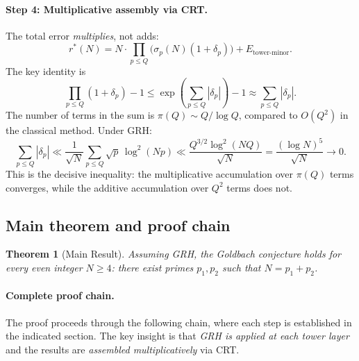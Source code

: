 \documentclass[11pt,a4paper]{article}
\newtheorem{theorem}{Theorem}[section]
\theoremstyle{remark}
\begin{document}
\paragraph{Step 4: Multiplicative assembly via CRT.}
The total error \emph{multiplies}, not adds:
\begin{equation}
\label{eq:multiplicative-error}
  r^*(N) = N \cdot \prod_{p \leq Q}\bigl(\sigma_p(N)(1 + \delta_p)\bigr)
    + E_{\text{tower-minor}}.
\end{equation}
The key identity is
\begin{equation}
\label{eq:product-to-sum}
  \prod_{p \leq Q}(1+\delta_p) - 1
  \leq \exp\!\left(\sum_{p \leq Q}|\delta_p|\right) - 1
  \approx \sum_{p \leq Q}|\delta_p|.
\end{equation}
The number of terms in the sum is $\pi(Q) \sim Q/\log Q$, compared to
$O(Q^2)$ in the classical method.  Under GRH:
\begin{equation}
\label{eq:GRH-sum}
  \sum_{p \leq Q}|\delta_p|
  \ll \frac{1}{\sqrt{N}}\sum_{p \leq Q}\sqrt{p}\,\log^2(Np)
  \ll \frac{Q^{3/2}\log^2(NQ)}{\sqrt{N}}
  = \frac{(\log N)^5}{\sqrt{N}} \to 0.
\end{equation}
This is the decisive inequality: the multiplicative accumulation
over $\pi(Q)$ terms converges, while the additive accumulation
over $Q^2$ terms does not.

\subsection{Main theorem and proof chain}

\begin{theorem}[Main Result]
\label{thm:main}
Assuming GRH, the Goldbach conjecture holds for every even integer
$N \geq 4$: there exist primes $p_1, p_2$ such that $N = p_1 + p_2$.
\end{theorem}

\paragraph{Complete proof chain.}
The proof proceeds through the following chain, where each step is
established in the indicated section.  The key insight is that
\emph{GRH is applied at each tower layer} and the results are
\emph{assembled multiplicatively} via CRT.
\end{document}
